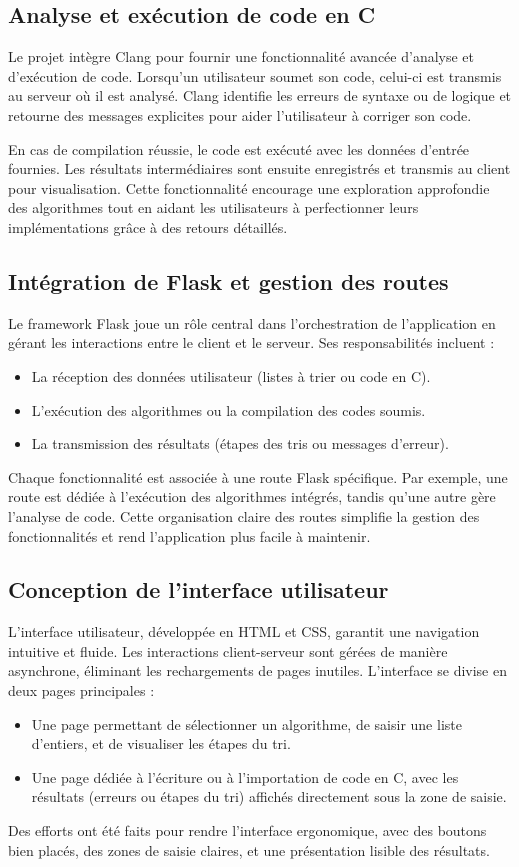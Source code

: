 \documentclass[a4paper, 12pt, twoside]{article}
\begin{document}
\subsection{Analyse et exécution de code en C}
Le projet intègre Clang pour fournir une fonctionnalité avancée d’analyse et d’exécution de code. Lorsqu’un utilisateur soumet son code, celui-ci est transmis au serveur où il est analysé. Clang identifie les erreurs de syntaxe ou de logique et retourne des messages explicites pour aider l’utilisateur à corriger son code.
\newline

En cas de compilation réussie, le code est exécuté avec les données d’entrée fournies. Les résultats intermédiaires sont ensuite enregistrés et transmis au client pour visualisation. Cette fonctionnalité encourage une exploration approfondie des algorithmes tout en aidant les utilisateurs à perfectionner leurs implémentations grâce à des retours détaillés.
\vspace{30pt}
\subsection{Intégration de Flask et gestion des routes}
Le framework Flask joue un rôle central dans l’orchestration de l’application en gérant les interactions entre le client et le serveur. Ses responsabilités incluent :
\begin{itemize}
\item La réception des données utilisateur (listes à trier ou code en C).
\item L’exécution des algorithmes ou la compilation des codes soumis.
\item La transmission des résultats (étapes des tris ou messages d’erreur).
\end{itemize}
Chaque fonctionnalité est associée à une route Flask spécifique. Par exemple, une route est dédiée à l’exécution des algorithmes intégrés, tandis qu’une autre gère l’analyse de code. Cette organisation claire des routes simplifie la gestion des fonctionnalités et rend l’application plus facile à maintenir.
\vspace{30pt}
\subsection{Conception de l’interface utilisateur}
L’interface utilisateur, développée en HTML et CSS, garantit une navigation intuitive et fluide. Les interactions client-serveur sont gérées de manière asynchrone, éliminant les rechargements de pages inutiles. L’interface se divise en deux pages principales :
\begin{itemize}
\item Une page permettant de sélectionner un algorithme, de saisir une liste d’entiers, et de visualiser les étapes du tri.
\item Une page dédiée à l’écriture ou à l’importation de code en C, avec les résultats (erreurs ou étapes du tri) affichés directement sous la zone de saisie.
\end{itemize}
Des efforts ont été faits pour rendre l’interface ergonomique, avec des boutons bien placés, des zones de saisie claires, et une présentation lisible des résultats.
\vspace{30pt}
\end{document}
